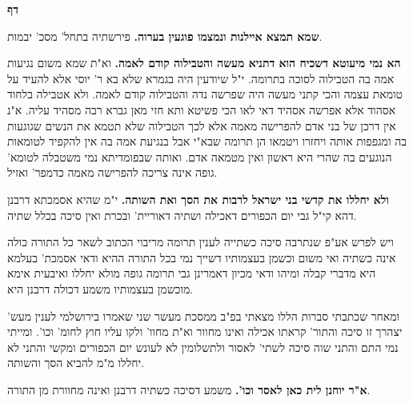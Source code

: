\documentclass[12pt, openany]{book}
\newcommand{\sethebfont}{
\fontsize{10.5pt}{21.0pt} \selectfont
}
\newcommand{\twocol}[1]{
	{\sethebfont \begin{multicols}{2}
			#1
	\end{multicols}}	
}
\newcommand{\chapname}{}
\newcommand{\newchap}[1]{
	\addcontentsline{toc}{chapter}{#1}
	\renewcommand{\chapname}{#1}
		\begin{center}
			\textbf{%
\fontsize{16pt}{16pt}\selectfont
				#1}
		\end{center}
}
\begin{document}
\newchap{דף }
\twocol{\textbf{שמא תמצא איילנות ונמצמו פוגעין בערוה.}  פירשתיה בתחל' מסכ' יבמות.
\par\textbf{הא נמי מיעוטא דשכיח הוא דתניא מעשה והטבילוה קודם לאמה.}  וא"ת שמא משום נגיעות אמה בה הטבילוה לסוכה בתרומה. י"ל שיודעין היה בגמרא שלא בא ר' יוסי אלא להעיד על טומאת עצמה והכי קתני מעשה היה שפרשה נדה והטבילוה קודם לאמה. ולא אטבילה בלחוד אסהוד אלא אפרשה אסהיד דאי לאו הכי פשיטא ותא חזי מאן גברא רבה מסהיד עליה. א"נ אין דרכן של בני אדם להפרישה מאמה אלא לכך הטבילוה שלא תטמא את הנשים שגוגעות בה ומגפפות אותה ויחזרו ויטמאו הן תרומה שבא"י אבל בנגיעת אמה בה אין להקפיד לטומאות הנוגעים בה שהרי היא ראשון ואין מטמאה אדם. ואותה שבפומדיתא נמי משטבלה לטומא' גופה אינה צריכה להפרישה מאמה כדמפר' ואזיל. 
\par\textbf{ולא יחללו את קדשי בני ישראל לרבות את הסך ואת השותה.}  י"מ שהיא אסמכתא דרבנן דהא קי"ל גבי יום הכפורים דאכילה ושתיה דאוריית' ובכרת ואין סיכה בכלל שתיה.\par  ויש לפרש אע"פ שנתרבה סיכה כשתייה לענין תרומה מריבוי הכתוב לשאר כל התורה כולה אינה כשתיה ואי משום וכשמן בעצמותיו דשייך נמי בכל התורה ההיא ודאי אסמכת' בעלמא היא מדברי קבלה ומיהו ודאי מכיון דאמרינן גבי תרומה גופה מולא יחללו ואיבעית אימא מוכשמן בעצמותיו משמע דכולה דרבנן היא.\par  ומאחר שכתבתי סברות הללו מצאתי בפ"ב ממסכת מעשר שני שאמרו בירושלמי לענין מעש' יצהרך זו סיכה והתור' קראתו אכילה ואינו מחוור וא"ת מחוו' ולקו עליו חוץ לחומ' וכו'. ומייתי נמי התם והתני שוה סיכה לשתי' לאסור ולתשלומין לא לעונש יום הכפורים ומקשי והתני לא יחללו מ"מ להביא הסך והשותה. 
\par\textbf{א"ר יוחנן לית כאן לאסר וכו'.}  משמע דסיכה כשתיה דרבנן ואינה מחוורת מן התורה. 
\par}
\end{document}
